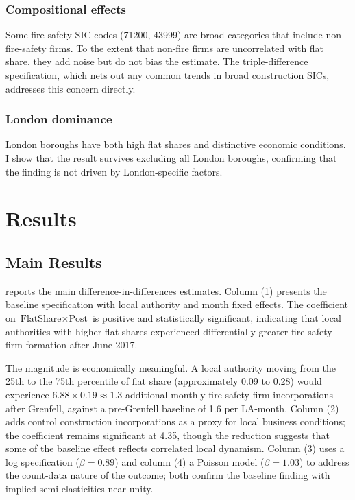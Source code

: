 \documentclass[12pt]{article}
\begin{document}
\subsubsection*{Compositional effects} Some fire safety SIC codes (71200, 43999) are broad categories that include non-fire-safety firms. To the extent that non-fire firms are uncorrelated with flat share, they add noise but do not bias the estimate. The triple-difference specification, which nets out any common trends in broad construction SICs, addresses this concern directly.

\subsubsection*{London dominance} London boroughs have both high flat shares and distinctive economic conditions. I show that the result survives excluding all London boroughs, confirming that the finding is not driven by London-specific factors.


\section{Results}

\subsection{Main Results}

 reports the main difference-in-differences estimates. Column (1) presents the baseline specification with local authority and month fixed effects. The coefficient on $\text{FlatShare} \times \text{Post}$ is positive and statistically significant, indicating that local authorities with higher flat shares experienced differentially greater fire safety firm formation after June 2017.

The magnitude is economically meaningful. A local authority moving from the 25th to the 75th percentile of flat share (approximately 0.09 to 0.28) would experience $6.88 \times 0.19 \approx 1.3$ additional monthly fire safety firm incorporations after Grenfell, against a pre-Grenfell baseline of 1.6 per LA-month. Column (2) adds control construction incorporations as a proxy for local business conditions; the coefficient remains significant at 4.35, though the reduction suggests that some of the baseline effect reflects correlated local dynamism. Column (3) uses a log specification ($\beta = 0.89$) and column (4) a Poisson model ($\beta = 1.03$) to address the count-data nature of the outcome; both confirm the baseline finding with implied semi-elasticities near unity.
\end{document}
